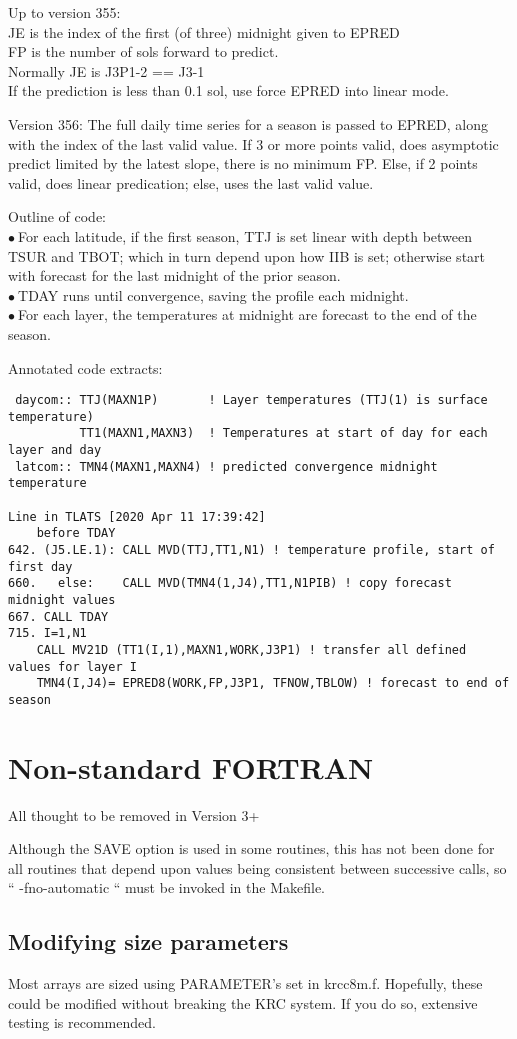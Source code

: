 \documentclass{article}
\newcommand{\qi}{\\ \hspace*{2.em}}      %
\newcommand{\qb}{\\ $ \bullet \ $}        %
\begin{document}
Up to version 355:
\\ JE is the index  of the first (of three) midnight given to EPRED
\\ FP is the number of sols forward to predict.
\qi Normally JE is J3P1-2 == J3-1
\qi If the prediction is less than 0.1 sol, use force EPRED into linear mode.

Version 356: The full daily time series for a season is passed to EPRED, along with the index of the last valid value.  If 3 or more points valid, does asymptotic predict limited by the latest slope, there is no minimum FP.
Else, if 2 points valid, does linear predication; else, uses the last valid value.

Outline of code: 
\qb For each latitude, if the first season, TTJ is set linear with depth between TSUR and TBOT; which in turn depend upon how IIB is set; otherwise start with forecast for the last midnight of the prior season.
\qb TDAY runs until convergence, saving the profile each midnight.
\qb For each layer, the temperatures at midnight are forecast to the end of the season.

Annotated code extracts:
\vspace{-3.mm} 
\begin{verbatim}
 daycom:: TTJ(MAXN1P)       ! Layer temperatures (TTJ(1) is surface temperature)
          TT1(MAXN1,MAXN3)  ! Temperatures at start of day for each layer and day
 latcom:: TMN4(MAXN1,MAXN4) ! predicted convergence midnight temperature

Line in TLATS [2020 Apr 11 17:39:42]
    before TDAY
642. (J5.LE.1): CALL MVD(TTJ,TT1,N1) ! temperature profile, start of first day
660.   else:    CALL MVD(TMN4(1,J4),TT1,N1PIB) ! copy forecast midnight values 
667. CALL TDAY
715. I=1,N1  
    CALL MV21D (TT1(I,1),MAXN1,WORK,J3P1) ! transfer all defined values for layer I
    TMN4(I,J4)= EPRED8(WORK,FP,J3P1, TFNOW,TBLOW) ! forecast to end of season
\end{verbatim}  


\section{Non-standard FORTRAN}
All thought to be removed in Version 3+

Although the SAVE option is used in some routines, this has not been done for all routines that depend upon values being consistent between successive calls, so `` -fno-automatic `` must be invoked in the Makefile.

\subsection{Modifying size parameters}
Most arrays are sized using PARAMETER's set in krcc8m.f. Hopefully, these could
be modified without breaking the KRC system. If you do so, extensive testing is
recommended.
\end{document}
